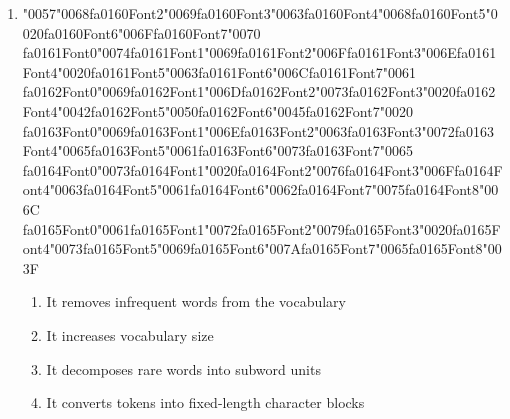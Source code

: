 \documentclass[12pt]{article}
\begin{document}
\begin{enumerate}[label=Q\arabic*.]
 \item {\char"0057}{\char"0068}{\csname fa0160Font2\endcsname\char"0069}{\csname fa0160Font3\endcsname\char"0063}{\csname fa0160Font4\endcsname\char"0068}{\csname fa0160Font5\endcsname\char"0020}{\csname fa0160Font6\endcsname\char"006F}{\csname fa0160Font7\endcsname\char"0070} {\csname fa0161Font0\endcsname\char"0074}{\csname fa0161Font1\endcsname\char"0069}{\csname fa0161Font2\endcsname\char"006F}{\csname fa0161Font3\endcsname\char"006E}{\csname fa0161Font4\endcsname\char"0020}{\csname fa0161Font5\endcsname\char"0063}{\csname fa0161Font6\endcsname\char"006C}{\csname fa0161Font7\endcsname\char"0061} {\csname fa0162Font0\endcsname\char"0069}{\csname fa0162Font1\endcsname\char"006D}{\csname fa0162Font2\endcsname\char"0073}{\csname fa0162Font3\endcsname\char"0020}{\csname fa0162Font4\endcsname\char"0042}{\csname fa0162Font5\endcsname\char"0050}{\csname fa0162Font6\endcsname\char"0045}{\csname fa0162Font7\endcsname\char"0020} {\csname fa0163Font0\endcsname\char"0069}{\csname fa0163Font1\endcsname\char"006E}{\csname fa0163Font2\endcsname\char"0063}{\csname fa0163Font3\endcsname\char"0072}{\csname fa0163Font4\endcsname\char"0065}{\csname fa0163Font5\endcsname\char"0061}{\csname fa0163Font6\endcsname\char"0073}{\csname fa0163Font7\endcsname\char"0065} {\csname fa0164Font0\endcsname\char"0073}{\csname fa0164Font1\endcsname\char"0020}{\csname fa0164Font2\endcsname\char"0076}{\csname fa0164Font3\endcsname\char"006F}{\csname fa0164Font4\endcsname\char"0063}{\csname fa0164Font5\endcsname\char"0061}{\csname fa0164Font6\endcsname\char"0062}{\csname fa0164Font7\endcsname\char"0075}{\csname fa0164Font8\endcsname\char"006C} {\csname fa0165Font0\endcsname\char"0061}{\csname fa0165Font1\endcsname\char"0072}{\csname fa0165Font2\endcsname\char"0079}{\csname fa0165Font3\endcsname\char"0020}{\csname fa0165Font4\endcsname\char"0073}{\csname fa0165Font5\endcsname\char"0069}{\csname fa0165Font6\endcsname\char"007A}{\csname fa0165Font7\endcsname\char"0065}{\csname fa0165Font8\endcsname\char"003F}
 \begin{enumerate}[label=(\Alph*)]
     \item It removes infrequent words from the vocabulary
     \item It increases vocabulary size
     \item It decomposes rare words into subword units
     \item It converts tokens into fixed-length character blocks
 \end{enumerate}
 

\end{enumerate}
\end{document}
